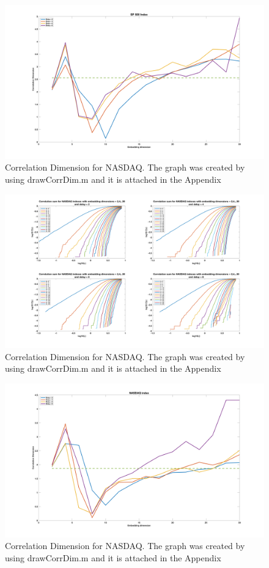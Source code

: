 \begin{figure}[!ht]
\includegraphics[scale=.15]{Images/SP500CD2}
\caption{Correlation Dimension for NASDAQ. The graph was created by using drawCorrDim.m and it is attached in the Appendix}
\label{fig:SP500CD2}
\end{figure}

\begin{figure}[!ht]
\includegraphics[scale=.15]{Images/NASDAQCD1}
\caption{Correlation Dimension for NASDAQ. The graph was created by using drawCorrDim.m and it is attached in the Appendix}
\label{fig:NASDAQCD1}
\end{figure}

\begin{figure}[!ht]
\includegraphics[scale=.15]{Images/NASDAQCD2}
\caption{Correlation Dimension for NASDAQ. The graph was created by using drawCorrDim.m and it is attached in the Appendix}
\label{fig:NASDAQCD2}
\end{figure}




